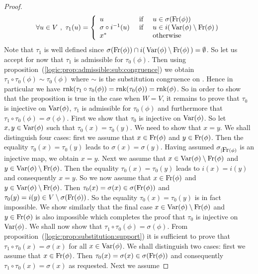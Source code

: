 \begin{proof}
    \[
    \forall u\in V\ ,\ \tau_{1}(u)=\left\{
        \begin{array}{lcl}
        u&\mbox{\ if\ }&u\in\sigma(\free(\phi))\\
        \sigma\circ i^{-1}(u)&\mbox{\ if\ }&u\in i(\,\var(\phi)\setminus\free(\phi)\,)\\
        x^{*}&\mbox{\ \ \ \ }&\mbox{otherwise}
        \end{array}
    \right.
    \]
Note that $\tau_{1}$ is well defined since $\sigma(\mbox{\rm Fr}(\phi))\cap
i(\,\mbox{\rm Var}(\phi)\setminus\mbox{\rm Fr}(\phi)\,)=\emptyset$. So let us accept
for now that $\tau_{1}$ is admissible for $\tau_{0}(\phi)$. Then
using proposition~(\ref{logic:prop:admissible:sub:congruence}) we
obtain $\tau_{1}\circ\tau_{0}(\phi)\sim\tau_{0}(\phi)$ where $\sim$
is the substitution congruence on \pv. Hence in particular we have
$\mbox{\rm rnk}(\tau_{1}\circ\tau_{0}(\phi))=\mbox{\rm rnk}(\tau_{0}(\phi))=\mbox{\rm rnk}(\phi)$.
So in order to show that the proposition is true in the case when
$W=V$, it remains to prove that $\tau_{0}$ is injective on
$\mbox{\rm Var}(\phi)$, $\tau_{1}$ is admissible for $\tau_{0}(\phi)$ and
furthermore that $\tau_{1}\circ\tau_{0}(\phi)=\sigma(\phi)$. First
we show that $\tau_{0}$ is injective on $\mbox{\rm Var}(\phi)$. So let
$x,y\in\mbox{\rm Var}(\phi)$ such that $\tau_{0}(x)=\tau_{0}(y)$. We need to
show that $x=y$. We shall distinguish four cases: first we assume
that $x\in\mbox{\rm Fr}(\phi)$ and $y\in\mbox{\rm Fr}(\phi)$. Then the equality
$\tau_{0}(x)=\tau_{0}(y)$ leads to $\sigma(x)=\sigma(y)$. Having
assumed $\sigma_{|\mbox{\rm Fr}(\phi)}$ is an injective map, we obtain
$x=y$. Next we assume that $x\in\mbox{\rm Var}(\phi)\setminus\mbox{\rm Fr}(\phi)$ and
$y\in\mbox{\rm Var}(\phi)\setminus\mbox{\rm Fr}(\phi)$. Then the equality
$\tau_{0}(x)=\tau_{0}(y)$ leads to $i(x)=i(y)$ and consequently
$x=y$. So we now assume that $x\in\mbox{\rm Fr}(\phi)$ and
$y\in\mbox{\rm Var}(\phi)\setminus\mbox{\rm Fr}(\phi)$. Then
$\tau_{0}(x)=\sigma(x)\in\sigma(\mbox{\rm Fr}(\phi))$ and
$\tau_{0}(y)=i(y)\in V\setminus\sigma(\mbox{\rm Fr}(\phi))$. So the equality
$\tau_{0}(x)=\tau_{0}(y)$ is in fact impossible. We show similarly
that the final case $x\in\mbox{\rm Var}(\phi)\setminus\mbox{\rm Fr}(\phi)$ and
$y\in\mbox{\rm Fr}(\phi)$ is also impossible which completes the proof that
$\tau_{0}$ is injective on $\mbox{\rm Var}(\phi)$. We shall now show that
$\tau_{1}\circ\tau_{0}(\phi)=\sigma(\phi)$. From
proposition~(\ref{logic:prop:substitution:support}) it is sufficient
to prove that $\tau_{1}\circ\tau_{0}(x)=\sigma(x)$ for all
$x\in\mbox{\rm Var}(\phi)$. We shall distinguish two cases: first we assume
that $x\in\mbox{\rm Fr}(\phi)$. Then
$\tau_{0}(x)=\sigma(x)\in\sigma(\mbox{\rm Fr}(\phi))$ and consequently
$\tau_{1}\circ\tau_{0}(x)=\sigma(x)$ as requested. Next we assume

\end{proof}
